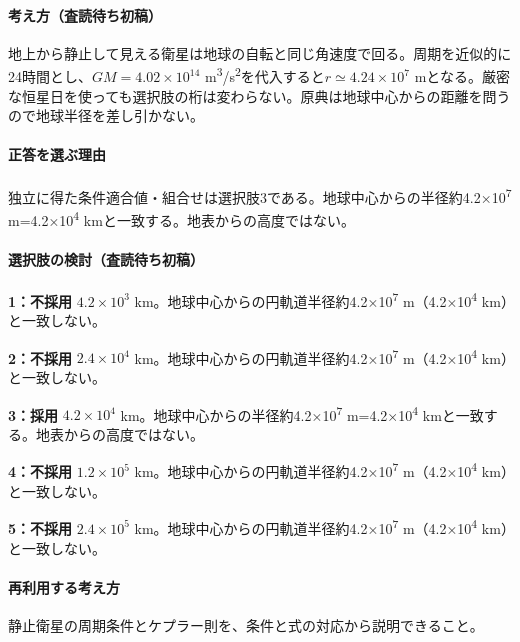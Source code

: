 \paragraph{考え方（査読待ち初稿）} 地上から静止して見える衛星は地球の自転と同じ角速度で回る。周期を近似的に24時間とし、\(GM=4.02\times10^{14}\) m\textsuperscript{3}/s\textsuperscript{2}を代入すると\(r\simeq4.24\times10^7\) mとなる。厳密な恒星日を使っても選択肢の桁は変わらない。原典は地球中心からの距離を問うので地球半径を差し引かない。

\paragraph{正答を選ぶ理由} 独立に得た条件適合値・組合せは選択肢3である。地球中心からの半径約4.2×10\textsuperscript{7} m=4.2×10\textsuperscript{4} kmと一致する。地表からの高度ではない。

\paragraph{選択肢の検討（査読待ち初稿）}

\noindent\textbf{1：不採用} \(4.2\times10^3\) km。地球中心からの円軌道半径約4.2×10\textsuperscript{7} m（4.2×10\textsuperscript{4} km）と一致しない。\par

\noindent\textbf{2：不採用} \(2.4\times10^4\) km。地球中心からの円軌道半径約4.2×10\textsuperscript{7} m（4.2×10\textsuperscript{4} km）と一致しない。\par

\noindent\textbf{3：採用} \(4.2\times10^4\) km。地球中心からの半径約4.2×10\textsuperscript{7} m=4.2×10\textsuperscript{4} kmと一致する。地表からの高度ではない。\par

\noindent\textbf{4：不採用} \(1.2\times10^5\) km。地球中心からの円軌道半径約4.2×10\textsuperscript{7} m（4.2×10\textsuperscript{4} km）と一致しない。\par

\noindent\textbf{5：不採用} \(2.4\times10^5\) km。地球中心からの円軌道半径約4.2×10\textsuperscript{7} m（4.2×10\textsuperscript{4} km）と一致しない。\par

\paragraph{再利用する考え方} 静止衛星の周期条件とケプラー則を、条件と式の対応から説明できること。

